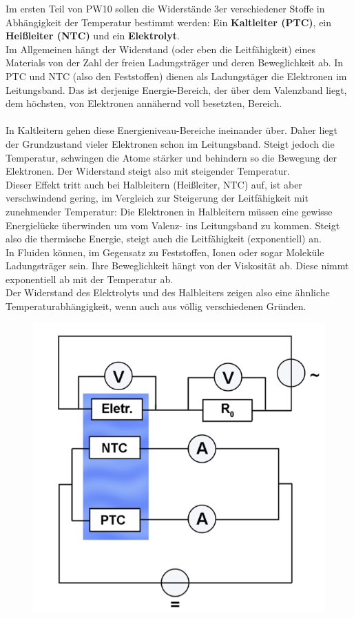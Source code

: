 \documentclass[12pt,a4paper]{article}
\begin{document}
\begin{multicols}{2}
Im ersten Teil von PW10 sollen die Widerstände 3er verschiedener Stoffe in Abhängigkeit der Temperatur bestimmt werden: Ein \textbf{Kaltleiter (PTC)}, ein  \textbf{Heißleiter (NTC)} und ein  \textbf{Elektrolyt}.
\\
Im Allgemeinen hängt der Widerstand (oder eben die Leitfähigkeit) eines Materials von der Zahl der freien Ladungsträger und deren Beweglichkeit ab. In PTC und NTC (also den Feststoffen) dienen als Ladungstäger die Elektronen im Leitungsband. Das ist derjenige Energie-Bereich, der über dem Valenzband liegt, dem höchsten, von Elektronen annähernd voll besetzten, Bereich.\\
\\
In Kaltleitern gehen diese Energieniveau-Bereiche ineinander über. Daher liegt der Grundzustand vieler Elektronen schon im Leitungsband. Steigt jedoch die Temperatur, schwingen die Atome stärker und behindern so die Bewegung der Elektronen. Der Widerstand steigt also mit steigender Temperatur.
\\
Dieser Effekt tritt auch bei Halbleitern (Heißleiter, NTC) auf, ist aber verschwindend gering, im Vergleich zur Steigerung der Leitfähigkeit mit zunehmender Temperatur: Die Elektronen in Halbleitern müssen eine gewisse Energielücke überwinden um vom Valenz- ins Leitungsband zu kommen. Steigt also die thermische Energie, steigt auch die Leitfähigkeit (exponentiell) an.
\\
In Fluiden können, im Gegensatz zu Feststoffen, Ionen oder sogar Moleküle Ladungsträger sein. Ihre Beweglichkeit hängt von der Viskosität ab. Diese nimmt exponentiell ab mit der Temperatur ab.
\\
Der Widerstand des Elektrolyts und des Halbleiters zeigen also eine ähnliche Temperaturabhängigkeit, wenn auch aus völlig verschiedenen Gründen.
\\
\begin{figure}[H]
	\centering
	\includegraphics[scale=0.80]{./figure/schaltskizze_temp-widerst.png}

\end{figure}
\end{multicols}
\end{document}
